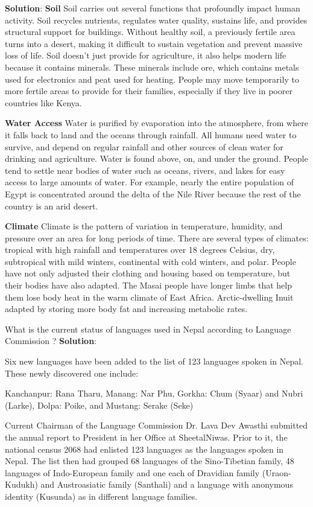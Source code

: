 \documentclass[
]{book}
\newcommand{\question}{\item}
\newenvironment{solution}{ {\bfseries Solution}:}{}
\begin{document}
\begin{questions}
\begin{solution}
\textbf{Soil}
Soil carries out several functions that profoundly impact human activity. Soil recycles nutrients, regulates water quality, sustains life, and provides structural support for buildings. Without healthy soil, a previously fertile area turns into a desert, making it difficult to sustain vegetation and prevent massive loss of life. Soil doesn't just provide for agriculture, it also helps modern life because it contains minerals. These minerals include ore, which contains metals used for electronics and peat used for heating. People may move temporarily to more fertile areas to provide for their families, especially if they live in poorer countries like Kenya.

\textbf{Water Access}
Water is purified by evaporation into the atmosphere, from where it falls back to land and the oceans through rainfall. All humans need water to survive, and depend on regular rainfall and other sources of clean water for drinking and agriculture. Water is found above, on, and under the ground. People tend to settle near bodies of water such as oceans, rivers, and lakes for easy access to large amounts of water. For example, nearly the entire population of Egypt is concentrated around the delta of the Nile River because the rest of the country is an arid desert.

\textbf{Climate}
Climate is the pattern of variation in temperature, humidity, and pressure over an area for long periods of time. There are several types of climates: tropical with high rainfall and temperatures over 18 degrees Celsius, dry, subtropical with mild winters, continental with cold winters, and polar. People have not only adjusted their clothing and housing based on temperature, but their bodies have also adapted. The Masai people have longer limbs that help them lose body heat in the warm climate of East Africa. Arctic-dwelling Inuit adapted by storing more body fat and increasing metabolic rates.
\end{solution}

\question What is the current status of languages used in Nepal according to Language Commission ?
\begin{solution}

Six new languages have been added to the list of 123 languages spoken in Nepal. These newly discovered one include:

Kanchanpur: Rana Tharu,
Manang: Nar Phu,
Gorkha: Chum (Syaar) and Nubri (Larke),
Dolpa: Poike, and
Mustang: Serake (Seke)

Current Chairman of the Language Commission Dr. Lava Dev Awasthi submitted the annual report to President in her Office at SheetalNiwas. Prior to it, the national census 2068 had enlisted 123 languages as the languages spoken in Nepal. The list then had grouped 68 languages of the Sino-Tibetian family, 48 languages of Indo-European family and one each of Dravidian family (Uraon-Kudukh) and Austroasiatic family (Santhali) and a language with anonymous identity (Kusunda) as in different language families.


\end{solution}
\end{questions}
\end{document}
